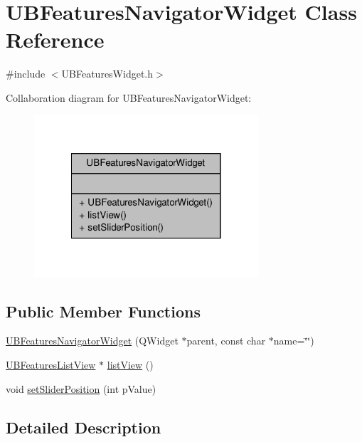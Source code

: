 \hypertarget{class_u_b_features_navigator_widget}{\section{U\-B\-Features\-Navigator\-Widget Class Reference}
\label{d0/dc0/class_u_b_features_navigator_widget}
}


{\ttfamily \#include $<$U\-B\-Features\-Widget.\-h$>$}



Collaboration diagram for U\-B\-Features\-Navigator\-Widget\-:
\nopagebreak
\begin{figure}[H]
\begin{center}
\leavevmode
\includegraphics[width=236pt]{dd/d9f/class_u_b_features_navigator_widget__coll__graph}
\end{center}
\end{figure}
\subsection*{Public Member Functions}
\begin{DoxyCompactItemize}
\item 
\hyperlink{class_u_b_features_navigator_widget_ac73b5bd04a38664ddd600635c86caa20}{U\-B\-Features\-Navigator\-Widget} (Q\-Widget $\ast$parent, const char $\ast$name=\char`\"{}\char`\"{})
\item 
\hyperlink{class_u_b_features_list_view}{U\-B\-Features\-List\-View} $\ast$ \hyperlink{class_u_b_features_navigator_widget_a348dbe1b8fc1d2bff7a00d9fbcbf0ad9}{list\-View} ()
\item 
void \hyperlink{class_u_b_features_navigator_widget_afce8cb89b855b3d92c1e7bdb141f11af}{set\-Slider\-Position} (int p\-Value)
\end{DoxyCompactItemize}


\subsection{Detailed Description}


